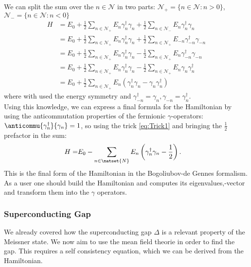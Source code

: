 \documentclass[../main.tex]{subfile}
\begin{document}
We can split the sum over the $n\in\mathcal{N}$ in two parts: $\mathcal{N}_+ = \{n \in \mathcal{N} : n> 0 \}$, $\mathcal{N}_- = \{n \in \mathcal{N} : n<0 \}$
\begin{align*}
    H &= E_0 + \frac{1}{2}\sum_{n\in\mathcal{N}_+} E_n \gamma^{\dagger}_n\gamma_n + \frac{1}{2}\sum_{n\in\mathcal{N}_-} E_n \gamma^{\dagger}_n\gamma_n\\
      &= E_0 + \frac{1}{2}\sum_{n\in\mathcal{N}_+} E_n \gamma^{\dagger}_n\gamma_n + \frac{1}{2}\sum_{n\in\mathcal{N}_+} E_{-n} \gamma^{\dagger}_{-n}\gamma_{-n}\\
      &= E_0 + \frac{1}{2}\sum_{n\in\mathcal{N}_+} E_n \gamma^{\dagger}_n\gamma_n - \frac{1}{2}\sum_{n\in\mathcal{N}_+} E_n \gamma^{\dagger}_{-n}\gamma_{-n}\\
      &= E_0 + \frac{1}{2}\sum_{n\in\mathcal{N}_+} E_n \gamma^{\dagger}_n\gamma_n - \frac{1}{2}\sum_{n\in\mathcal{N}_+} E_n \gamma_{n}\gamma^{\dagger}_{n}\\
      &= E_0 + \frac{1}{2}\sum_{n\in\mathcal{N}_+} E_n \left( \gamma^{\dagger}_n\gamma_n -\gamma_{n}\gamma^{\dagger}_{n}\right)
\end{align*}
where with used the energy symmetry and $\gamma^{\dagger}_{-n} =\gamma_{n}, \gamma_{-n} =\gamma^{\dagger}_{n}$.\\

Using this knowledge, we can express a final formula for the Hamiltonian by using the anticommutation properties of the fermionic $\gamma$-operators:
 $\anticommu{\gamma^{\dagger}_n}{\gamma_{n}} = 1$, so using the trick \ref{eq:Trick1} and bringing the $\frac{1}{2}$ prefactor in the sum:
\begin{align}
    H =& E_0 - \sum_{n\in \natset{N}} E_n \left( \gamma_n^{\dagger}\gamma_n - \frac{1}{2}\right).
\end{align}
This is the final form of the Hamiltonian in the Bogoliubov-de Gennes formalism. As a user one should build the Hamiltonian 
and computes its eigenvalues,-vector and transform them into the $\gamma$ operators.\\

\subsubsection{Superconducting Gap}
We already covered how the superconducting gap $\Delta$ is a relevant property of the Meissner state. We now aim to use the  mean field 
theorie in order to find the gap. This requires a self consistency equation, which we can be derived from the Hamiltonian.\\ 
\end{document}
